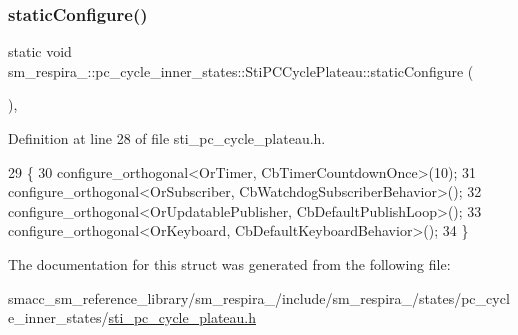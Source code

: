 \subsubsection{\texorpdfstring{static\+Configure()}{staticConfigure()}}
{\footnotesize\ttfamily static void sm\+\_\+respira\+\_\+::pc\+\_\+cycle\+\_\+inner\+\_\+states\+::\+Sti\+P\+C\+Cycle\+Plateau\+::static\+Configure (\begin{DoxyParamCaption}{ }\end{DoxyParamCaption})\hspace{0.3cm}{\ttfamily [inline]}, {\ttfamily [static]}}



Definition at line 28 of file sti\+\_\+pc\+\_\+cycle\+\_\+plateau.\+h.


\begin{DoxyCode}
29   \{
30     configure\_orthogonal<OrTimer, CbTimerCountdownOnce>(10);
31     configure\_orthogonal<OrSubscriber, CbWatchdogSubscriberBehavior>();
32     configure\_orthogonal<OrUpdatablePublisher, CbDefaultPublishLoop>();
33     configure\_orthogonal<OrKeyboard, CbDefaultKeyboardBehavior>();
34   \}
\end{DoxyCode}


The documentation for this struct was generated from the following file\+:\begin{DoxyCompactItemize}
\item 
smacc\+\_\+sm\+\_\+reference\+\_\+library/sm\+\_\+respira\+\_/include/sm\+\_\+respira\+\_/states/pc\+\_\+cycle\+\_\+inner\+\_\+states/\hyperlink{sti__pc__cycle__plateau_8h}{sti\+\_\+pc\+\_\+cycle\+\_\+plateau.\+h}\end{DoxyCompactItemize}
